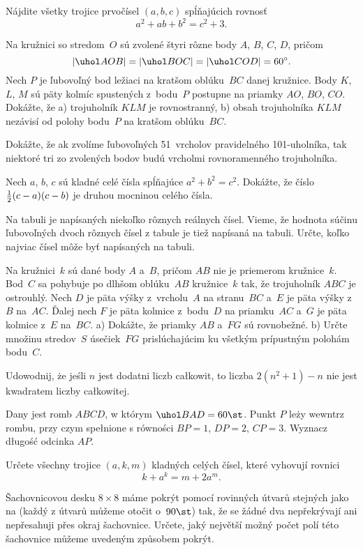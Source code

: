 {%
Nájdite všetky trojice prvočísel $(a,b,c)$ spĺňajúcich
rovnosť
$$
a^2+ab+b^2=c^2+3.
$$}

{%
Na kružnici so stredom~$O$ sú zvolené štyri rôzne body $A$, $B$, $C$, $D$, pričom
$$
|\uhol AOB|=|\uhol BOC|=|\uhol COD|=60^\circ.
$$
Nech $P$ je ľubovoľný bod ležiaci na kratšom oblúku~$BC$ danej kružnice.
Body $K$, $L$, $M$ sú päty kolmíc spustených z~bodu~$P$ postupne
na priamky $AO$, $BO$, $CO$. Dokážte, že
\ite a) trojuholník $KLM$ je rovnostranný,
\ite b) obsah trojuholníka $KLM$ nezávisí od polohy bodu~$P$ na kratšom oblúku~$BC$.\endgraf}

{%
Dokážte, že ak zvolíme ľubovoľných 51~vrcholov pravidelného 101-uholníka, tak niektoré tri
zo zvolených bodov budú vrcholmi rovnoramenného trojuholníka.}

{%
Nech $a$, $b$, $c$ sú kladné celé čísla spĺňajúce $a^2+b^2=c^2$. Dokážte, že
číslo ${1\over2}(c-a)(c-b)$ je druhou mocninou celého čísla.}

{%
Na tabuli je napísaných niekoľko rôznych reálnych čísel.
Vieme, že hodnota súčinu ľubovoľných dvoch rôznych čísel z tabule je
tiež napísaná na tabuli.
Určte, koľko najviac čísel môže byť napísaných na tabuli.}

{%
Na kružnici~$k$ sú dané body $A$ a~$B$, pričom $AB$ nie je priemerom
kružnice~$k$.
Bod~$C$ sa pohybuje po dlhšom oblúku~$AB$ kružnice~$k$ tak, že trojuholník $ABC$ je ostrouhlý.
Nech $D$ je päta výšky z~vrcholu~$A$ na stranu~$BC$ a~$E$ je päta výšky z~$B$ na~$AC$.
Ďalej nech $F$ je päta kolmice z~bodu~$D$ na priamku~$AC$ a~$G$ je päta kolmice z~$E$ na~$BC$.
\ite a) Dokážte, že priamky $AB$ a~$FG$ sú rovnobežné.
\ite b) Určte množinu stredov~$S$ úsečiek~$FG$ prislúchajúcim ku všetkým prípustným polohám bodu~$C$.\endgraf}

{%
Udowodnij, że jeśli $n$ jest dodatni\ą{} liczb\ą{} ca\l{}kowit\ą{}, to liczba $2(n^2 + 1) - n$ nie jest
kwadratem liczby ca\l{}kowitej.}

{%
Dany jest romb $ABCD$, w którym $\uhol BAD = 60\st$. Punkt $P$ leży wewn\ą{}trz rombu, przy
czym spe\l{}nione s\ą{} równości $BP = 1$, $DP = 2$, $CP = 3$. Wyznacz d\l{}ugość odcinka $AP$.}

{%
Určete všechny trojice $(a,k,m)$ kladných celých čísel, které vyhovují rovnici
$$k+a^k=m+2a^m.$$
}

{%
Šachovnicovou desku $8\times8$ máme pokrýt pomocí rovinných útvarů stejných
jako na \obr{} (každý z útvarů můžeme otočit o~$90\st$) tak, že se žádné
dva nepřekrývají ani nepřesahuji přes okraj šachovnice. Určete, jaký největší
možný počet polí této šachovnice můžeme uvedeným způsobem pokrýt.
%
}
